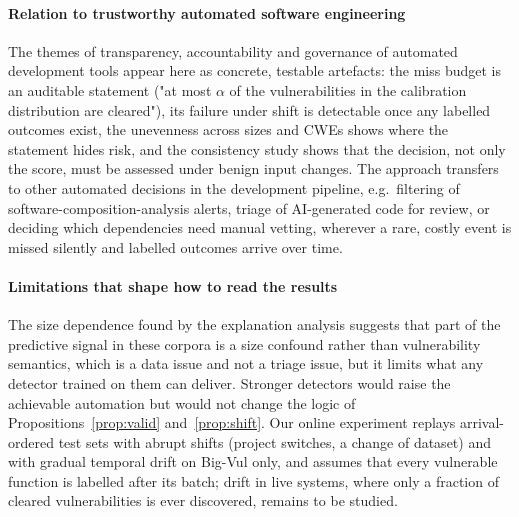 \paragraph{Relation to trustworthy automated software engineering}
The themes of transparency, accountability and governance of automated development tools appear here as concrete, testable artefacts: the miss budget is an auditable statement ("at most $\alpha$ of the vulnerabilities in the calibration distribution are cleared"), its failure under shift is detectable once any labelled outcomes exist, the unevenness across sizes and CWEs shows where the statement hides risk, and the consistency study shows that the decision, not only the score, must be assessed under benign input changes. The approach transfers to other automated decisions in the development pipeline, e.g.\ filtering of software-composition-analysis alerts, triage of AI-generated code for review, or deciding which dependencies need manual vetting, wherever a rare, costly event is missed silently and labelled outcomes arrive over time.

\paragraph{Limitations that shape how to read the results}
The size dependence found by the explanation analysis suggests that part of the predictive signal in these corpora is a size confound rather than vulnerability semantics, which is a data issue and not a triage issue, but it limits what any detector trained on them can deliver. Stronger detectors would raise the achievable automation but would not change the logic of Propositions~\ref{prop:valid} and~\ref{prop:shift}. Our online experiment replays arrival-ordered test sets with abrupt shifts (project switches, a change of dataset) and with gradual temporal drift on Big-Vul only, and assumes that every vulnerable function is labelled after its batch; drift in live systems, where only a fraction of cleared vulnerabilities is ever discovered, remains to be studied.
